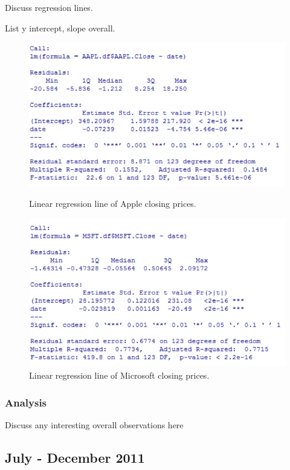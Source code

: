 \documentclass[paper=a4, fontsize=11pt]{scrartcl} %
\numberwithin{equation}{section} %
\numberwithin{figure}{section} %
\numberwithin{table}{section} %
\begin{document}
Discuss regression lines. 

List y intercept, slope overall. 

\begin{figure}[!htb]
  \includegraphics[width=\linewidth]{graph/aapl_reg_1.png}
  \caption{Linear regression line of Apple closing prices.}
\endminipage\hfill
{}
  \includegraphics[width=\linewidth]{graph/msft_reg_1.png}
  \caption{Linear regression line of Microsoft closing prices.}
\endminipage\hfill
\end{figure}


\subsubsection{Analysis}
Discuss any interesting overall observations here

\subsection{July - December  2011 }
\end{document}
